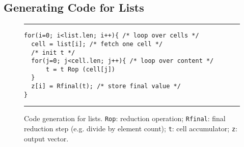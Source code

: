 \subsection{Generating Code for Lists}


\begin{figure}[htbp]
\par\noindent\rule{\columnwidth}{0.6pt}
\begin{small}
\begin{verbatim} 
for(i=0; i<list.len; i++){ /* loop over cells */
  cell = list[i]; /* fetch one cell */
  /* init t */
  for(j=0; j<cell.len; j++){ /* loop over content */
      t = t Rop (cell[j])
  }
  z[i] = Rfinal(t); /* store final value */
}
\end{verbatim}
\end{small}
\vspace{-1mm}
\par\noindent\rule{\columnwidth}{0.6pt}
\caption{Code generation for lists. \texttt{Rop}: reduction operation; \texttt{Rfinal}: final reduction step (e.g. divide by element count); \texttt{t}: cell accumulator; \texttt{z}: output vector.} \label{fig:codegen_lists}
\end{figure}

